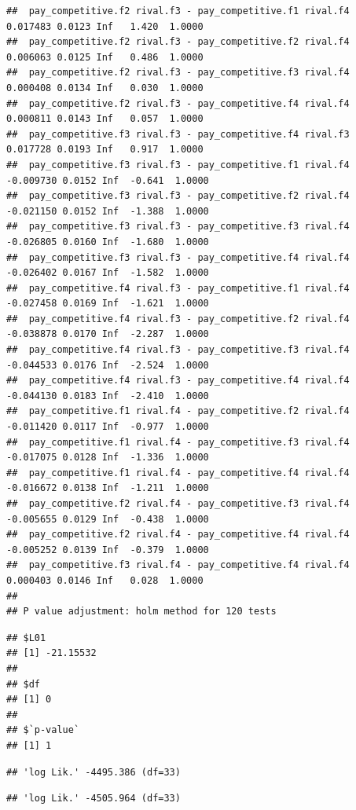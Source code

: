 \documentclass[
]{article}
\begin{document}
\begin{verbatim}
##  pay_competitive.f2 rival.f3 - pay_competitive.f1 rival.f4  0.017483 0.0123 Inf   1.420  1.0000
##  pay_competitive.f2 rival.f3 - pay_competitive.f2 rival.f4  0.006063 0.0125 Inf   0.486  1.0000
##  pay_competitive.f2 rival.f3 - pay_competitive.f3 rival.f4  0.000408 0.0134 Inf   0.030  1.0000
##  pay_competitive.f2 rival.f3 - pay_competitive.f4 rival.f4  0.000811 0.0143 Inf   0.057  1.0000
##  pay_competitive.f3 rival.f3 - pay_competitive.f4 rival.f3  0.017728 0.0193 Inf   0.917  1.0000
##  pay_competitive.f3 rival.f3 - pay_competitive.f1 rival.f4 -0.009730 0.0152 Inf  -0.641  1.0000
##  pay_competitive.f3 rival.f3 - pay_competitive.f2 rival.f4 -0.021150 0.0152 Inf  -1.388  1.0000
##  pay_competitive.f3 rival.f3 - pay_competitive.f3 rival.f4 -0.026805 0.0160 Inf  -1.680  1.0000
##  pay_competitive.f3 rival.f3 - pay_competitive.f4 rival.f4 -0.026402 0.0167 Inf  -1.582  1.0000
##  pay_competitive.f4 rival.f3 - pay_competitive.f1 rival.f4 -0.027458 0.0169 Inf  -1.621  1.0000
##  pay_competitive.f4 rival.f3 - pay_competitive.f2 rival.f4 -0.038878 0.0170 Inf  -2.287  1.0000
##  pay_competitive.f4 rival.f3 - pay_competitive.f3 rival.f4 -0.044533 0.0176 Inf  -2.524  1.0000
##  pay_competitive.f4 rival.f3 - pay_competitive.f4 rival.f4 -0.044130 0.0183 Inf  -2.410  1.0000
##  pay_competitive.f1 rival.f4 - pay_competitive.f2 rival.f4 -0.011420 0.0117 Inf  -0.977  1.0000
##  pay_competitive.f1 rival.f4 - pay_competitive.f3 rival.f4 -0.017075 0.0128 Inf  -1.336  1.0000
##  pay_competitive.f1 rival.f4 - pay_competitive.f4 rival.f4 -0.016672 0.0138 Inf  -1.211  1.0000
##  pay_competitive.f2 rival.f4 - pay_competitive.f3 rival.f4 -0.005655 0.0129 Inf  -0.438  1.0000
##  pay_competitive.f2 rival.f4 - pay_competitive.f4 rival.f4 -0.005252 0.0139 Inf  -0.379  1.0000
##  pay_competitive.f3 rival.f4 - pay_competitive.f4 rival.f4  0.000403 0.0146 Inf   0.028  1.0000
## 
## P value adjustment: holm method for 120 tests
\end{verbatim}

\begin{verbatim}
## $L01
## [1] -21.15532
## 
## $df
## [1] 0
## 
## $`p-value`
## [1] 1
\end{verbatim}

\begin{verbatim}
## 'log Lik.' -4495.386 (df=33)
\end{verbatim}

\begin{verbatim}
## 'log Lik.' -4505.964 (df=33)
\end{verbatim}
\end{document}

